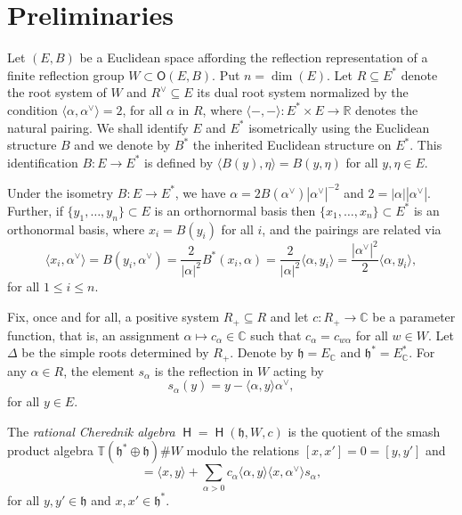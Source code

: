 \documentclass[pdftex]{sigma}
\numberwithin{equation}{section}
\newcommand{\fh}{\mathfrak{h}}
\newcommand{\bbc}{\mathbb{C}}
\newcommand{\bbr}{\mathbb{R}}
\newcommand{\bbt}{\mathbb{T}}
\DeclareMathOperator{\rca}{\mathsf{H}}
\begin{document}
\section{Preliminaries}\label{s:Prelims}

Let $(E,B)$ be a Euclidean space affording the reflection representation of a finite reflection group $W\subset \mathsf{O}(E,B)$. Put $n = \dim(E)$. Let $R\subseteq E^*$ denote the root system of $W$ and $R^\vee\subseteq E$ its dual root system normalized by the condition $\langle \alpha,\alpha^\vee \rangle = 2$, for all $\alpha$ in $R$, where $\langle -,- \rangle\colon E^*\times E \to \bbr$ denotes the natural pairing. We shall identify $E$ and $E^*$ isometrically using the Euclidean structure $B$ and we denote by $B^*$ the inherited Euclidean structure on $E^*$. This identification $B\colon E \to E^*$ is defined by $\langle B(y),\eta \rangle = B(y,\eta)$ for all $y,\eta\in E$.
\begin{Remark}
Under the isometry $B\colon E \to E^*$, we have
$\alpha = 2B(\alpha^\vee)|\alpha^\vee|^{-2}$ and $2=|\alpha||\alpha^\vee|$. Further, if $\{y_1,\dots,y_n\}\subset E$ is an orthornormal basis then $\{x_1,\dots,x_n\}\subset E^*$ is an orthonormal basis, where $x_i = B(y_i)$ for all $i$, and the pairings are related via
\begin{equation}\label{e:pairings}
\langle x_i,\alpha^\vee \rangle = B(y_i,\alpha^\vee)
= \frac{2}{|\alpha|^2} B^*(x_i,\alpha)
= \frac{2}{|\alpha|^2}\langle \alpha,y_i \rangle
= \frac{|\alpha^\vee|^2}{2}\langle \alpha,y_i \rangle,
\end{equation}
for all $1\leq i \leq n$.
\end{Remark}
Fix, once and for all, a positive system $R_+\subseteq R$ and let $c\colon R_+\to \bbc$ be a parameter function, that is, an assignment $\alpha \mapsto c_\alpha \in \bbc$ such that $c_\alpha = c_{w\alpha}$ for all $w \in W$. Let $\Delta$ be the simple roots determined by $R_+$. Denote by $\fh = E_\bbc$ and $\fh^* = E^*_\bbc$. For any $\alpha \in R$, the element $s_\alpha$ is the reflection in $W$ acting by
\[ s_\alpha(y) = y - \langle \alpha , y \rangle \alpha^\vee,
\]
for all $y \in E$.

\begin{Definition}[\cite{EG02}] \label{d:RCA}
The {\it rational Cherednik algebra} $\rca = \rca(\fh,W,c)$ is the quotient of the smash product algebra $\bbt(\fh^*\oplus\fh)\#W$ modulo the relations $[x,x']=0=[y,y']$ and
\begin{equation*}%
[y,x] = \langle x,y \rangle + \sum_{\alpha>0} c_\alpha \langle \alpha,y\rangle \langle x, \alpha^\vee \rangle s_\alpha,
\end{equation*}
for all $y,y'\in \fh$ and $x,x' \in \fh^*$.
\end{Definition}
\end{document}
